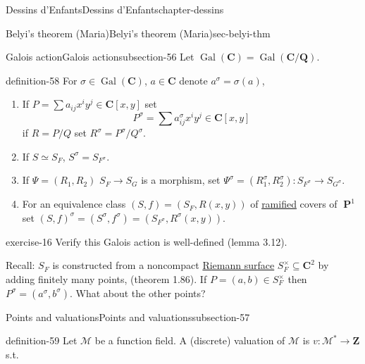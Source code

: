 \documentclass[oneside,10pt,]{book}
\numberwithin{equation}{section}
\newcommand{\lb}{[}
\newcommand{\rb}{]}
\newcommand{\ZZ}{\mathbf{Z}}
\newcommand{\QQ}{\mathbf{Q}}
\newcommand{\CC}{\mathbf{C}}
\newcommand{\Gal}[2]{\operatorname{Gal}(#1/#2)}
\DeclareMathOperator{\PP}{\mathbf{P}}
\begin{document}
\begin{chapterptx}{Dessins d'Enfants}{}{Dessins d'Enfants}{}{}{chapter-dessins}
\begin{sectionptx}{Belyi's theorem (Maria)}{}{Belyi's theorem (Maria)}{}{}{sec-belyi-thm}
\typeout{************************************************}
%
\begin{subsectionptx}{Galois action}{}{Galois action}{}{}{subsection-56}
\hypertarget{p-611}{}%
Let \(\operatorname{Gal}(\CC) = \Gal{\CC}{\QQ}\).%
\begin{definition}{}{definition-58}%
\hypertarget{p-612}{}%
For \(\sigma \in \operatorname{Gal}(\CC)\), \(a\in \CC\) denote \(a^\sigma = \sigma(a)\),\leavevmode%
\begin{enumerate}
\item\hypertarget{li-117}{}If \(P = \sum a_{ij} x^iy^j \in \CC\lb x,y\rb\) set%
\begin{equation*}
P^\sigma = \sum a^\sigma_{ij} x^iy^j \in \CC\lb x,y\rb
\end{equation*}
if \(R = P/Q\) set \(R^\sigma = P^\sigma / Q^\sigma\).%
\item\hypertarget{li-118}{}If \(S \simeq S_F\), \(S^\sigma = S_{F^\sigma}\).%
\item\hypertarget{li-119}{}If \(\Psi = (R_1, R_2)\) \(S_F\to S_G\) is a morphism, set \(\Psi^ \sigma = (R_1^\sigma , R_2 ^\sigma) \colon S_{F^\sigma} \to S_{G^\sigma}\).%
\item\hypertarget{li-120}{}For an equivalence class \((S,f) = (S_F, R(x,y))\) of \hyperref[def-dess-ramified]{ramified} covers of \(\PP^1\) set \((S,f)^\sigma = (S^\sigma, f^\sigma) = (S_{F^\sigma}, R^\sigma (x,y))\).%
\end{enumerate}
%
\end{definition}
\begin{inlineexercise}{}{exercise-16}%
\hypertarget{p-613}{}%
Verify this Galois action is well-defined (lemma 3.12).%
\end{inlineexercise}
\hypertarget{p-614}{}%
Recall: \(S_F\) is    constructed from a noncompact \hyperref[def-top-riem-surface]{Riemann surface} \(S_F^\times \subseteq \CC^2\) by adding finitely many points, (theorem 1.86). If \(P=  (a,b) \in S_F^\times\) then \(P^\sigma = (a^\sigma, b^\sigma)\). What about the other points?%
\end{subsectionptx}
%
%
\typeout{************************************************}
\typeout{************************************************}
%
\begin{subsectionptx}{Points and valuations}{}{Points and valuations}{}{}{subsection-57}
\begin{definition}{}{definition-59}%
\hypertarget{p-615}{}%
Let \(\mathcal M\) be a function field. A (discrete) valuation of \(\mathcal M\) is \(v \colon \mathcal M^* \to \ZZ\) s.t.\leavevmode%

\end{definition}
\end{subsectionptx}
\end{sectionptx}
\end{chapterptx}
\end{document}
